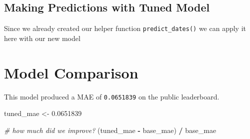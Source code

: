 \documentclass[]{book}
\newenvironment{Shaded}{\begin{snugshade}}{\end{snugshade}}
\newcommand{\KeywordTok}[1]{\textcolor[rgb]{0.13,0.29,0.53}{\textbf{#1}}}
\newcommand{\DataTypeTok}[1]{\textcolor[rgb]{0.13,0.29,0.53}{#1}}
\newcommand{\DecValTok}[1]{\textcolor[rgb]{0.00,0.00,0.81}{#1}}
\newcommand{\FloatTok}[1]{\textcolor[rgb]{0.00,0.00,0.81}{#1}}
\newcommand{\StringTok}[1]{\textcolor[rgb]{0.31,0.60,0.02}{#1}}
\newcommand{\CommentTok}[1]{\textcolor[rgb]{0.56,0.35,0.01}{\textit{#1}}}
\newcommand{\ControlFlowTok}[1]{\textcolor[rgb]{0.13,0.29,0.53}{\textbf{#1}}}
\newcommand{\OperatorTok}[1]{\textcolor[rgb]{0.81,0.36,0.00}{\textbf{#1}}}
\newcommand{\NormalTok}[1]{#1}
\theoremstyle{definition}
\theoremstyle{definition}
\theoremstyle{definition}
\theoremstyle{remark}
\begin{document}
\subsection{Making Predictions with Tuned
Model}\label{making-predictions-with-tuned-model}

Since we already created our helper function \texttt{predict\_dates()}
we can apply it here with our new model

\begin{Shaded}
\end{Shaded}

\section{Model Comparison}\label{model-comparison}

This model produced a MAE of \texttt{0.0651839} on the public
leaderboard.

\begin{Shaded}
\begin{Highlighting}[]
\NormalTok{tuned_mae <-}\StringTok{ }\FloatTok{0.0651839}

\CommentTok{# how much did we improve?}
\NormalTok{(tuned_mae }\OperatorTok{-}\StringTok{ }\NormalTok{base_mae) }\OperatorTok{/}\StringTok{ }\NormalTok{base_mae}
\end{Highlighting}
\end{Shaded}
\end{document}
